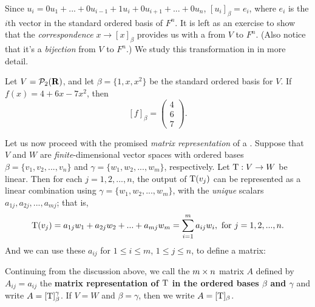\begin{note}
Since \(u_i = 0 u_1 + ... + 0 u_{i - 1} + 1 u_i + 0 u_{i + 1} + ... + 0 u_n\), \([u_i]_{\beta} = e_i\), where \(e_i\) is the \(i\)th vector in the standard ordered basis of \(F^{n}\).
It is left as an exercise to show that the \emph{correspondence} \(x \to [x]_{\beta}\) provides us with a \LTRAN{} from \(V\) to \(F^n\).
(Also notice that it's a \emph{bijection} from \(V\) to \(F^n\).)
We study this transformation in  in more
detail.
\end{note}

\begin{example} \label{example 2.2.2}
Let \(V = \mathcal{P}_2(\mathbf{R})\), and let \(\beta = \{ 1, x , x^2 \}\) be the standard ordered basis for \(V\).
If \(f(x) = 4 + 6x - 7x^2\), then
\[
    [f]_{\beta} = \begin{pmatrix} 4 \\ 6 \\ 7 \end{pmatrix}.
\]
\end{example}

Let us now proceed with the promised \emph{matrix representation} of a \LTRAN{}.
Suppose that \(V\) and \(W\) are \emph{finite}-dimensional vector spaces with ordered bases \(\beta = \{ v_1, v_2, ..., v_n \}\) and \(\gamma = \{ w_1, w_2, ..., w_m \}\), respectively.
Let \(\mathrm{T} : V \to W\) be linear.
Then for each \(j = 1, 2, ..., n\), the output of \(\mathrm{T}(v_j)\) can be represented as a linear combination using \(\gamma = \{ w_1, w_2, ..., w_m \}\), with the \emph{unique} scalars \(a_{1j}, a_{2j}, ..., a_{mj}\);
that is,
\[
    \mathrm{T}(v_j) = a_{1j} w_1 + a_{2j} w_2 + ... + a_{mj} w_m = \sum_{i = 1}^m a_{ij} w_i, \text{ for } j = 1, 2, ..., n.
\]
And we can use these \(a_{ij}\) for \(1 \le i \le m\), \(1 \le j \le n\), to define a matrix:

\begin{definition} \label{def 2.6}
Continuing from the discussion above, we call the \(m \times n\) matrix \(A\) defined by \(A_{ij} = a_{ij}\) the \textbf{matrix representation of \(\mathrm{T}\) in the ordered bases \(\beta\)
and \(\gamma\)} and write \(A = [\mathrm{T}]_{\beta}^{\gamma}\).
If \(V = W\) and \(\beta = \gamma\), then we write \(A = [\mathrm{T}]_{\beta}\).
\end{definition}

